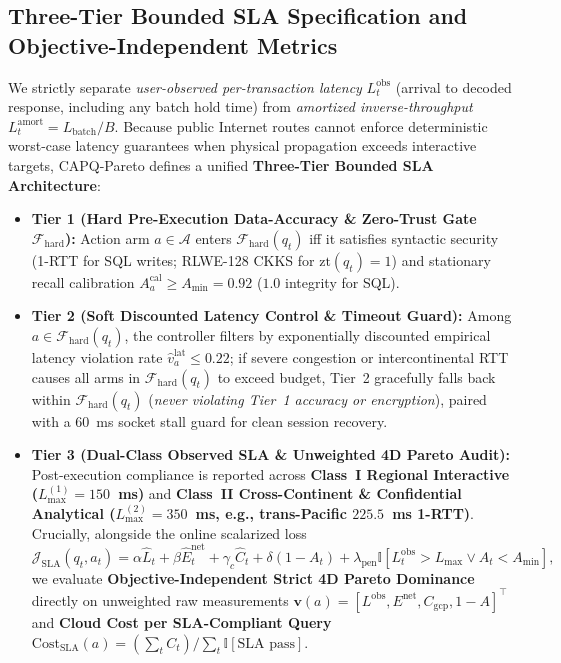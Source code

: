 \documentclass[10pt,journal,compsoc]{IEEEtran}
\begin{document}
\subsection{Three-Tier Bounded SLA Specification and Objective-Independent Metrics}
We strictly separate \emph{user-observed per-transaction latency} $L_t^{\mathrm{obs}}$ (arrival to decoded response, including any batch hold time) from \emph{amortized inverse-throughput} $L_t^{\mathrm{amort}} = L_{\mathrm{batch}}/B$. Because public Internet routes cannot enforce deterministic worst-case latency guarantees when physical propagation exceeds interactive targets, CAPQ-Pareto defines a unified \textbf{Three-Tier Bounded SLA Architecture}:
\begin{itemize}
    \item \textbf{Tier 1 (Hard Pre-Execution Data-Accuracy \& Zero-Trust Gate $\mathcal{F}_{\mathrm{hard}}$):} Action arm $a \in \mathcal{A}$ enters $\mathcal{F}_{\mathrm{hard}}(q_t)$ iff it satisfies syntactic security (1-RTT for SQL writes; RLWE-128 CKKS for $\mathrm{zt}(q_t)=1$) and stationary recall calibration $A_a^{\mathrm{cal}} \ge A_{\min} = 0.92$ ($1.0$ integrity for SQL).
    \item \textbf{Tier 2 (Soft Discounted Latency Control \& Timeout Guard):} Among $a \in \mathcal{F}_{\mathrm{hard}}(q_t)$, the controller filters by exponentially discounted empirical latency violation rate $\hat{v}_a^{\mathrm{lat}} \le 0.22$; if severe congestion or intercontinental RTT causes all arms in $\mathcal{F}_{\mathrm{hard}}(q_t)$ to exceed budget, Tier~2 gracefully falls back within $\mathcal{F}_{\mathrm{hard}}(q_t)$ (\emph{never violating Tier~1 accuracy or encryption}), paired with a $60$~ms socket stall guard for clean session recovery.
    \item \textbf{Tier 3 (Dual-Class Observed SLA \& Unweighted 4D Pareto Audit):} Post-execution compliance is reported across \textbf{Class~I Regional Interactive ($L_{\max}^{(1)} = 150$~ms)} and \textbf{Class~II Cross-Continent \& Confidential Analytical ($L_{\max}^{(2)} = 350$~ms, e.g., trans-Pacific $225.5$~ms 1-RTT)}. Crucially, alongside the online scalarized loss
    \begin{equation}
    \mathcal{J}_{\mathrm{SLA}}(q_t, a_t) = \alpha \hat{L}_t + \beta \hat{E}_t^{\mathrm{net}} + \gamma_c \hat{C}_t + \delta (1 - A_t) + \lambda_{\mathrm{pen}} \mathbb{I}\!\left[L_t^{\mathrm{obs}} > L_{\max} \lor A_t < A_{\min}\right],
    \label{eq:jsla}
    \end{equation}
    we evaluate \textbf{Objective-Independent Strict 4D Pareto Dominance} directly on unweighted raw measurements $\mathbf{v}(a) = [L^{\mathrm{obs}}, E^{\mathrm{net}}, C_{\mathrm{gcp}}, 1 - A]^\top$ and \textbf{Cloud Cost per SLA-Compliant Query} $\mathrm{Cost}_{\mathrm{SLA}}(a) = (\sum_t C_t) / \sum_t \mathbb{I}[\text{SLA pass}]$.
\end{itemize}
\end{document}
